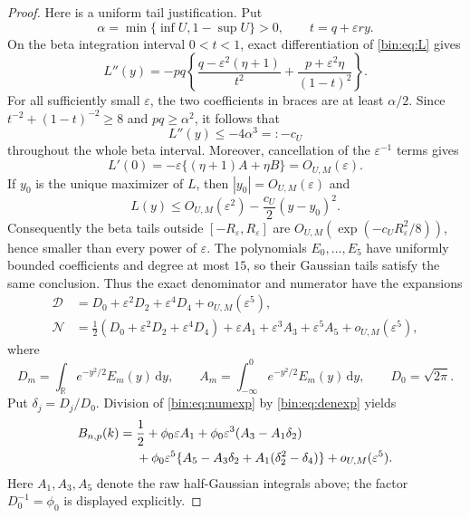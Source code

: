 \documentclass[11pt,a4paper]{article}
\numberwithin{equation}{section}
\theoremstyle{definition}
\theoremstyle{remark}
\newcommand{\dd}{\,\mathrm d}
\newcommand{\phiZ}{\phi_0}
\newcommand{\eps}{\varepsilon}
\begin{document}
\begin{proof}
Here is a uniform tail justification.  Put
\[
 \alpha=\min\{\inf U,1-\sup U\}>0,
 \qquad t=q+\eps r y.
\]
On the beta integration interval $0<t<1$, exact differentiation of
\eqref{bin:eq:L} gives
\begin{equation}\label{bin:eq:Lpp}
 L''(y)=-pq\left\{
 \frac{q-\eps^2(\eta+1)}{t^2}
 +\frac{p+\eps^2\eta}{(1-t)^2}\right\}.
\end{equation}
For all sufficiently small $\eps$, the two coefficients in braces are at
least $\alpha/2$.  Since
$t^{-2}+(1-t)^{-2}\ge8$ and $pq\ge\alpha^2$, it follows that
\[
 L''(y)\le-4\alpha^3=:-c_U
\]
throughout the whole beta interval.  Moreover, cancellation of the
$\eps^{-1}$ terms gives
\[
 L'(0)=-\eps\{(\eta+1)A+\eta B\}=O_{U,M}(\eps).
\]
If $y_0$ is the unique maximizer of $L$, then
$|y_0|=O_{U,M}(\eps)$ and
\[
 L(y)\le O_{U,M}(\eps^2)-\frac{c_U}{2}(y-y_0)^2.
\]
Consequently the beta tails outside $[-R_\eps,R_\eps]$ are
$O_{U,M}(\exp(-c_UR_\eps^2/8))$, hence smaller than every power of
$\eps$.  The polynomials $E_0,\ldots,E_5$ have uniformly bounded
coefficients and degree at most $15$, so their Gaussian tails satisfy the
same conclusion.  Thus the exact denominator and numerator have the
expansions
\begin{align}
 \mathcal D
 &=D_0+\eps^2D_2+\eps^4D_4+o_{U,M}(\eps^5),
 \label{bin:eq:denexp}\\
 \mathcal N
 &=\frac12(D_0+\eps^2D_2+\eps^4D_4)
 +\eps A_1+\eps^3A_3+\eps^5A_5
 +o_{U,M}(\eps^5),
 \label{bin:eq:numexp}
\end{align}
where
\[
 D_m=\int_{\mathbb R}e^{-y^2/2}E_m(y)\dd y,
 \qquad
 A_m=\int_{-\infty}^0e^{-y^2/2}E_m(y)\dd y,
 \qquad D_0=\sqrt{2\pi}.
\]
Put $\delta_j=D_j/D_0$.  Division of \eqref{bin:eq:numexp} by
\eqref{bin:eq:denexp} yields
\begin{align}
 B_{n,p}(k)
 ={}&\frac12+\phiZ\eps A_1
 +\phiZ\eps^3(A_3-A_1\delta_2) \notag\\
 &+\phiZ\eps^5
 \{A_5-A_3\delta_2+A_1(\delta_2^2-\delta_4)\}
 +o_{U,M}(\eps^5).
 \label{bin:eq:quotient}
\end{align}
Here $A_1,A_3,A_5$ denote the raw half-Gaussian integrals above; the
factor $D_0^{-1}=\phiZ$ is displayed explicitly.


\end{proof}
\end{document}
